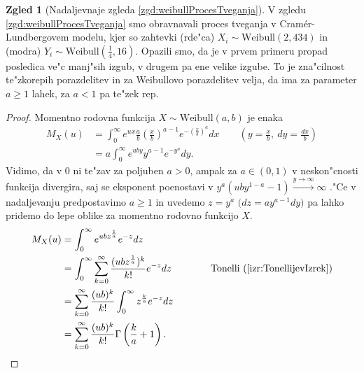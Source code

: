 \documentclass[12pt, a4paper, reqno]{amsart}
\theoremstyle{definition}
\newtheorem{zgled}[definicija]{Zgled}
\theoremstyle{plain}
\newcommand{\1}{\mathds{1}}
\begin{document}
        \begin{zgled}[Nadaljevnaje zgleda \ref{zgd:weibullProcesTveganja}]
            V zgledu \ref{zgd:weibullProcesTveganja} smo obravnavali proces tveganja v Cramér-Lundbergovem 
            modelu, kjer so zahtevki (rde"ca) $X_i\sim\text{Weibull}(2, 434)$ in (modra) 
            $Y_i\sim\text{Weibull}(\tfrac{1}{4}, 16)$. Opazili smo, da je v prvem primeru propad
            posledica ve"c manj"sih izgub, v drugem pa ene velike izgube. To je zna"cilnost te"zkorepih
            porazdelitev in za Weibullovo porazdelitev velja, da ima za parameter
            $a \geq 1$ lahek, za $a<1$ pa te"zek rep.
            \begin{proof}
                Momentno rodovna funkcija $X\sim\text{Weibull}(a, b)$ je enaka
                \begin{align*}
                    M_X(u) &= \int_{0}^{\infty}e^{ux}\frac{a}{b}\left(\frac{x}{b}\right)^{a-1}e^{-\left(\frac{x}{b}\right)^a}dx \qquad \left(y = \tfrac{x}{b},\ dy = \tfrac{dx}{b}\right) \\
                           &= a\int_{0}^{\infty}e^{uby} y^{a-1}e^{-y^a}dy.
                \end{align*}
                Vidimo, da v $0$ ni te"zav za poljuben $a > 0$, ampak za $a\in(0, 1)$ v neskon"cnosti funkcija 
                divergira, saj se 
                eksponent poenostavi v $y^a(uby^{1 - a} - 1)\xrightarrow{y\to\infty}\infty$ ."Ce v 
                nadaljevanju predpostavimo $a\geq 1$ in uvedemo $z = y^a$ 
                $\bigl(dz = ay^{a-1}dy\bigr)$ pa lahko pridemo do lepe oblike 
                za momentno rodovno funkcijo $X$. \phantom{\qedhere}
                \begin{align*}
                    M_X(u) &= \int_{0}^{\infty}e^{ubz^{\frac{1}{a}}}e^{-z}dz \\
                           &= \int_{0}^{\infty}\sum_{k=0}^{\infty}\frac{(ubz^{\frac{1}{a}})^k}{k!}e^{-z}dz \qquad \qquad \text{Tonelli} \ (\ref{izr:TonellijevIzrek}) \\
                           &= \sum_{k=0}^{\infty}\frac{(ub)^k}{k!}\int_{0}^{\infty}z^{\frac{k}{a}}e^{-z}dz \\
                           &= \sum_{k=0}^{\infty}\frac{(ub)^k}{k!}\Gamma\left(\frac{k}{a} + 1\right).
                \end{align*} 
            \end{proof}
            \label{zgd:weibullLahkorepnaPorazdelitev}
        \end{zgled}
    
\end{document}
